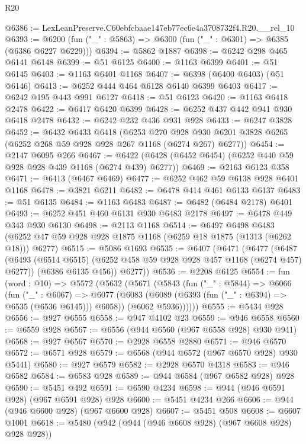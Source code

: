 \begin{lexlean}{R20}
\begin{coremodule}
@6386 := LexLeanPreserve.C60ebfcbaae147eb77ec6e4a3708732f4.R20.__rel_10
@6393 := @6200 (fun ("_" : @5863) => @6300 (fun ("_" : @6301) => @6385 (@6386 @6227 @6229)))
@6394 := @5862 @1887
@6398 := @6242 @298 @465 @6141 @6148
@6399 := @51 @6125
@6400 := @1163 @6399
@6401 := @51 @6145
@6403 := @1163 @6401 @1168
@6407 := @6398 (@6400 @6403) (@51 @6146)
@6413 := @6252 @444 @464 @6128 @6140 @6399 @6403
@6417 := @6242 @195 @443 @991 @6127
@6418 := @51 @6123
@6420 := @1163 @6418 @2478
@6422 := @6417 @6420 @6399
@6428 := @6252 @437 @442 @941 @930 @6418 @2478
@6432 := @6242 @232 @436 @931 @928
@6433 := @6247 @3828
@6452 := @6432
    @6433
    @6418
    (@6253
      @270
      @928
      @930
      @6201
      @3828
      @6265
      (@6252 @268 @59 @928 @928 @267 @1168 (@6274 @267) @6277))
@6454 := @2147 @6095 @266
@6467 := @6422 (@6428 (@6452 @6454) (@6252 @440 @59 @928 @928 @439 @1168 (@6274 @439) @6277))
@6469 := @2163 @6123 @358
@6471 := @6413 (@6467 @6469)
@6477 := @6252 @462 @59 @6138 @928 @6401 @1168
@6478 := @3821 @6211
@6482 := @6478 @414 @461 @6133 @6137
@6483 := @51 @6135
@6484 := @1163 @6483
@6487 := @6482 (@6484 @2178) @6401
@6493 := @6252 @451 @460 @6131 @930 @6483 @2178
@6497 := @6478 @449 @343 @930 @6130
@6498 := @2113 @1168
@6514 := @6497
    @6498
    @6483
    (@6252 @47 @59 @928 @928 @1875 @1168 (@6259 @18 @1875 (@1313 (@6262 @18))) @6277)
@6515 := @5086 @1693
@6535 := @6407
    (@6471
      (@6477
        (@6487
          (@6493 (@6514 @6515) (@6252 @458 @59 @928 @928 @457 @1168 (@6274 @457) @6277))
          (@6386 @6135 @456))
        @6277))
@6536 := @2208 @6125
@6554 := fun (word : @10) =>
  @5572
    (@5632
      (@5671
        (@5843
          (fun ("_" : @5844) =>
          @6066
            (fun ("_" : @6067) =>
            @6077
              (@6083 (@6089 (@6393 (fun ("_" : @6394) => @6535 (@6536 @6145))) @6058))
              (@6062 @5936))))))
@6555 := @5434 @928
@6556 := @927 @6555
@6558 := @947 @4102 @23
@6559 := @946 @6558
@6560 := @6559 @928
@6567 := @6556 (@944 @6560 (@967 @6558 @928) @930 @941)
@6568 := @927 @6567
@6570 := @2928 @6558 @2880
@6571 := @946 @6570
@6572 := @6571 @928
@6579 := @6568 (@944 @6572 (@967 @6570 @928) @930 @5441)
@6580 := @927 @6579
@6582 := @2928 @6570 @4318
@6583 := @946 @6582
@6584 := @6583 @928
@6589 := @944 @6584 (@967 @6582 @928) @928
@6590 := @5451 @492
@6591 := @6590 @4234
@6598 := @944 (@946 @6591 @928) (@967 @6591 @928) @928
@6600 := @5451 @4234 @266
@6606 := @944 (@946 @6600 @928) (@967 @6600 @928)
@6607 := @5451 @508
@6608 := @6607 @1001
@6618 := @5480 (@942 (@944 (@946 @6608 @928) (@967 @6608 @928) @928 @928))

\end{coremodule}
\end{lexlean}
